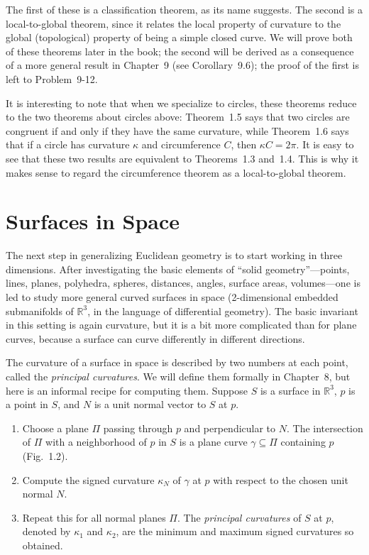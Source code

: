 The first of these is a classification theorem, as its name suggests. The second is a local-to-global theorem, since it relates the local property of curvature to the global (topological) property of being a simple closed curve. We will prove both of these theorems later in the book; the second will be derived as a consequence of a more general result in Chapter~9 (see Corollary~9.6); the proof of the first is left to Problem~9-12.

It is interesting to note that when we specialize to circles, these theorems reduce to the two theorems about circles above: Theorem~1.5 says that two circles are congruent if and only if they have the same curvature, while Theorem~1.6 says that if a circle has curvature $\kappa$ and circumference $C$, then $\kappa C = 2\pi$. It is easy to see that these two results are equivalent to Theorems~1.3 and~1.4. This is why it makes sense to regard the circumference theorem as a local-to-global theorem.

\section{Surfaces in Space}

The next step in generalizing Euclidean geometry is to start working in three dimensions. After investigating the basic elements of ``solid geometry''---points, lines, planes, polyhedra, spheres, distances, angles, surface areas, volumes---one is led to study more general curved surfaces in space (2-dimensional embedded submanifolds of $\mathbb{R}^3$, in the language of differential geometry). The basic invariant in this setting is again curvature, but it is a bit more complicated than for plane curves, because a surface can curve differently in different directions.

The curvature of a surface in space is described by two numbers at each point, called the \emph{principal curvatures}. We will define them formally in Chapter~8, but here is an informal recipe for computing them. Suppose $S$ is a surface in $\mathbb{R}^3$, $p$ is a point in $S$, and $N$ is a unit normal vector to $S$ at $p$.

\begin{enumerate}
\item Choose a plane $\Pi$ passing through $p$ and perpendicular to $N$. The intersection of $\Pi$ with a neighborhood of $p$ in $S$ is a plane curve $\gamma \subseteq \Pi$ containing $p$ (Fig.~1.2).
\item Compute the signed curvature $\kappa_N$ of $\gamma$ at $p$ with respect to the chosen unit normal $N$.
\item Repeat this for all normal planes $\Pi$. The \emph{principal curvatures} of $S$ at $p$, denoted by $\kappa_1$ and $\kappa_2$, are the minimum and maximum signed curvatures so obtained.
\end{enumerate}

